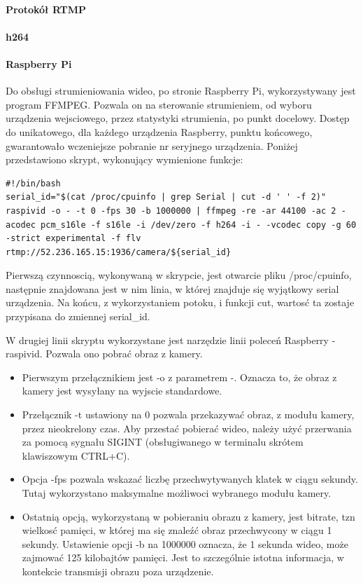 \paragraph{Protokół RTMP}

\paragraph{h264}

\paragraph{Raspberry Pi}

Do obsługi strumieniowania wideo, po stronie Raspberry Pi, wykorzystywany jest program FFMPEG. Pozwala on na sterowanie strumieniem, od wyboru urządzenia wejsciowego, przez statystyki strumienia, po punkt docelowy. Dostęp do unikatowego, dla każdego urządzenia Raspberry, punktu końcowego, gwarantowało wczeniejsze pobranie nr seryjnego urządzenia. Poniżej przedstawiono skrypt, wykonujący wymienione funkcje:
\begin{verbatim}
#!/bin/bash
serial_id="$(cat /proc/cpuinfo | grep Serial | cut -d ' ' -f 2)"
raspivid -o - -t 0 -fps 30 -b 1000000 | ffmpeg -re -ar 44100 -ac 2 -acodec pcm_s16le -f s16le -i /dev/zero -f h264 -i - -vcodec copy -g 60 -strict experimental -f flv rtmp://52.236.165.15:1936/camera/${serial_id}
\end{verbatim}

Pierwszą czynnoscią, wykonywaną w skrypcie, jest otwarcie pliku /proc/cpuinfo, następnie znajdowana jest w nim linia, w której znajduje się wyjątkowy serial urządzenia. Na końcu, z wykorzystaniem potoku, i funkcji cut, wartosć ta zostaje przypisana do zmiennej serial_id.

W drugiej linii skryptu wykorzystane jest narzędzie linii poleceń Raspberry - raspivid. Pozwala ono pobrać obraz z kamery. 
\begin{itemize}
\item Pierwszym przełącznikiem jest -o z parametrem -. Oznacza to, że obraz z kamery jest wysyłany na wyjscie standardowe.
\item Przełącznik -t ustawiony na 0 pozwala przekazywać obraz, z modułu kamery, przez nieokrelony czas. Aby przestać pobierać wideo, należy użyć przerwania za pomocą sygnału SIGINT (obsługiwanego w terminalu skrótem klawiszowym CTRL+C).
\item Opcja -fps pozwala wskazać liczbę przechwytywanych klatek w ciągu sekundy. Tutaj wykorzystano maksymalne możliwoci wybranego modułu kamery.
\item Ostatnią opcją, wykorzystaną w pobieraniu obrazu z kamery, jest bitrate, tzn wielkosć pamięci, w której ma się znaleźć obraz przechwycony w ciągu 1 sekundy. Ustawienie opcji -b na 1000000 oznacza, że 1 sekunda wideo, może zajmować 125 kilobajtów pamięci. Jest to szczególnie istotna informacja, w kontekcie transmisji obrazu poza urządzenie.
\end{itemize}

